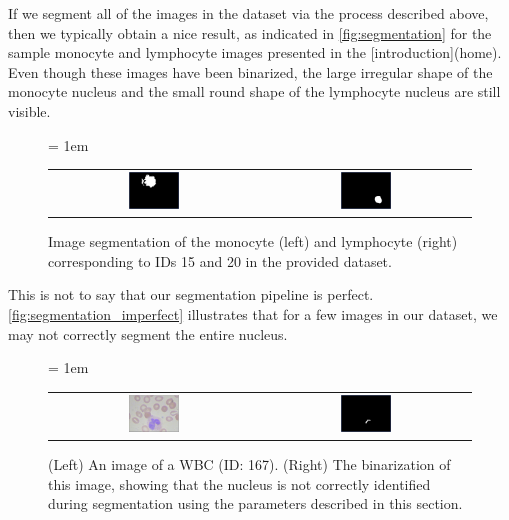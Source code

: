 If we segment all of the images in the dataset via the process described above, then we typically obtain a nice result, as indicated in \autoref{fig:segmentation} for the sample monocyte and lymphocyte images presented in the [introduction](home). Even though these images have been binarized, the large irregular shape of the monocyte nucleus and the small round shape of the lymphocyte nucleus are still visible.

\begin{figure}[h]
\centering
\tabcolsep = 1em
\mySfFamily
\begin{tabular}{c c}
\includegraphics[width = 0.25\textwidth]{../images/monocyte_binarized.png} & \includegraphics[width = 0.25\textwidth]{../images/lymphocyte_binarized.png}
\end{tabular}
\caption{Image segmentation of the monocyte (left) and lymphocyte (right) corresponding to IDs 15 and 20 in the provided dataset.}
\label{fig:segmentation}
\end{figure}

This is not to say that our segmentation pipeline is perfect. \autoref{fig:segmentation_imperfect} illustrates that for a few images in our dataset, we may not correctly segment the entire nucleus.

\begin{figure}[h]
\centering
\tabcolsep = 1em
\mySfFamily
\begin{tabular}{c c}
\includegraphics[width = 0.25\textwidth]{../images/WBC_167.png} & \includegraphics[width = 0.25\textwidth]{../images/WBC_167_segmentation.png}
\end{tabular}
\caption{(Left) An image of a WBC (ID: 167). (Right) The binarization of this image, showing that the nucleus is not correctly identified during segmentation using the parameters described in this section.}
\label{fig:segmentation_imperfect}
\end{figure}

